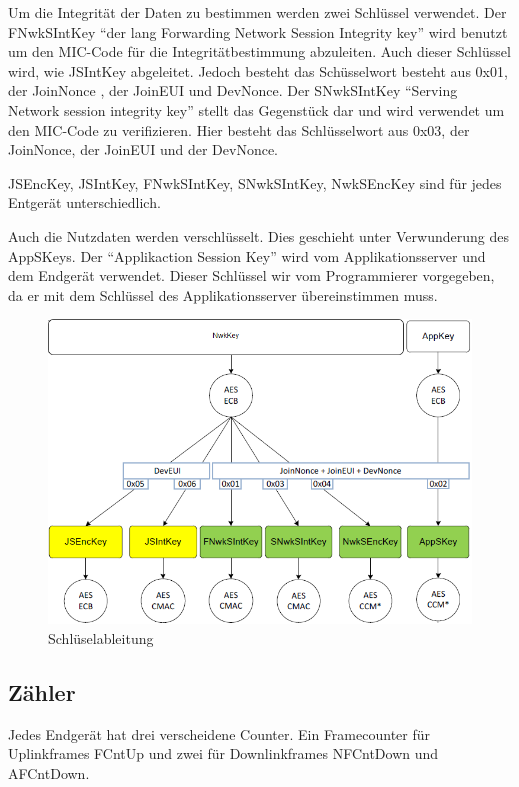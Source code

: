 \documentclass[a4paper, 12pt]{article}
\begin{document}
            Um die Integrität der Daten zu bestimmen werden zwei Schlüssel verwendet. Der FNwkSIntKey ``der lang Forwarding 
            Network Session Integrity key'' wird benutzt um den MIC-Code für die Integritätbestimmung abzuleiten. Auch 
            dieser Schlüssel wird, wie JSIntKey abgeleitet. Jedoch besteht das Schüsselwort besteht aus 0x01, der JoinNonce , der 
            JoinEUI und DevNonce. Der SNwkSIntKey ``Serving Network session integrity key'' stellt das Gegenstück dar und 
            wird verwendet um den MIC-Code zu verifizieren. Hier besteht das Schlüsselwort aus 0x03, der 
            JoinNonce, der JoinEUI und der DevNonce.

            JSEncKey, JSIntKey, FNwkSIntKey, SNwkSIntKey, NwkSEncKey sind für jedes Entgerät unterschiedlich.

            Auch die Nutzdaten werden verschlüsselt. Dies geschieht unter Verwunderung des AppSKeys. 
            Der ``Applikaction Session Key'' wird vom Applikationsserver und dem Endgerät verwendet. 
            Dieser Schlüssel wir vom Programmierer vorgegeben, da er 
            mit dem Schlüssel des Applikationsserver übereinstimmen muss.\cite[S.50 ff]{LoRaSpec}
            \newpage
            \begin{figure}[ht]
                \centering
                \includegraphics[width=\textwidth]{Schluessel}
                \caption{Schlüselableitung \cite[S. 63]{LoRaSpec}}
            \end{figure}

        \subsection{Zähler}\label{sec:Zaehler}
            Jedes Endgerät hat drei verscheidene Counter. Ein Framecounter für Uplinkframes FCntUp und zwei für 
            Downlinkframes NFCntDown und AFCntDown. 
\end{document}
